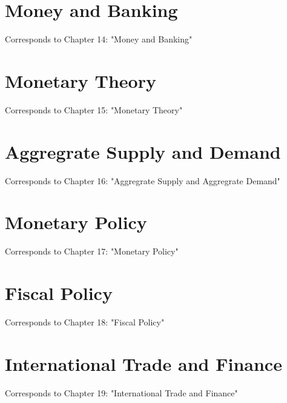\documentclass[12pt, a4paper]{article}
\theoremstyle{definition}
\begin{document}
\newpage

\section{Money and Banking}
Corresponds to Chapter 14: "Money and Banking"

\newpage

\section{Monetary Theory}
Corresponds to Chapter 15: "Monetary Theory"

\newpage

\section{Aggregrate Supply and Demand}
Corresponds to Chapter 16: "Aggregrate Supply and Aggregrate Demand"

\newpage

\section{Monetary Policy}
Corresponds to Chapter 17: "Monetary Policy"

\newpage

\section{Fiscal Policy}
Corresponds to Chapter 18: "Fiscal Policy"

\newpage

\section{International Trade and Finance}
Corresponds to Chapter 19: "International Trade and Finance"

\newpage
\end{document}
